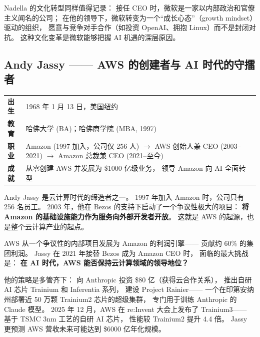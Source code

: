 Nadella 的文化转型同样值得记录：
接任 CEO 时，微软是一家以内部政治和官僚主义闻名的公司；
在他的领导下，微软转变为一个``成长心态''（growth mindset）驱动的组织，
愿意与竞争对手合作（如投资 OpenAI、拥抱 Linux）而不是封闭对抗。
这种文化变革是微软能够把握 AI 机遇的深层原因。

\subsection{Andy Jassy —— AWS 的创建者与 AI 时代的守擂者}
\label{subsec:jassy}

\begin{keybox}
\small
\begin{tabularx}{\textwidth}{lX}
\toprule
\textbf{出生} & 1968 年 1 月 13 日，美国纽约 \\
\textbf{教育} & 哈佛大学 (BA)；哈佛商学院 (MBA, 1997) \\
\textbf{职业} & Amazon (1997 加入，公司仅 256 人) $\to$
                AWS 创始人兼 CEO (2003--2021) $\to$
                Amazon 总裁兼 CEO (2021--至今) \\
\textbf{成就} & 从零创建 AWS 并发展为 \$1000 亿级业务，
                领导 Amazon 向 AI 全面转型 \\
\bottomrule
\end{tabularx}
\end{keybox}

Andy Jassy 是云计算时代的缔造者之一。
1997 年加入 Amazon 时，公司只有 256 名员工。
2003 年，他在 Bezos 的支持下启动了一个争议性极大的项目：
\textbf{将 Amazon 的基础设施能力作为服务向外部开发者开放}。
这就是 AWS 的起源，也是整个云计算产业的起点。

AWS 从一个争议性的内部项目发展为 Amazon 的利润引擎——
贡献约 60\% 的集团利润。
Jassy 在 2021 年接替 Bezos 成为 Amazon CEO 时，
面临的最大挑战是：
\textbf{在 AI 时代，AWS 能否保持云计算领域的领导地位？}

他的策略是多管齐下：
向 Anthropic 投资 \$80 亿（获得云合作关系），
推出自研 AI 芯片 Trainium 和 Inferentia 系列，
建设 Project Rainier——
一个在印第安纳州部署近 50 万颗 Trainium2 芯片的超级集群，
专门用于训练 Anthropic 的 Claude 模型。
2025 年 12 月，AWS 在 re:Invent 大会上发布了 Trainium3——
基于 TSMC 3nm 工艺的自研 AI 芯片，
性能较 Trainium2 提升 4.4 倍。
Jassy 更预测 AWS 营收未来可能达到 \$6000 亿年化规模。

